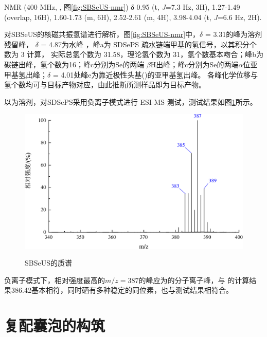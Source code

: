 \documentclass[bachelor,fandolfonts,replaceperiod]{jnuthesis}
\begin{document}
     NMR (400 MHz, , 图\ref{fig:SBSeUS-nmr}) δ 0.95 (t, \textit{J}=7.3 Hz, 3H), 1.27-1.49 (overlap, 16H), 
    1.60-1.73 (m, 6H), 2.52-2.61 (m, 4H), 3.98-4.04 (t, \textit{J}=6.6 Hz, 2H).
    
    对SBSeUS的核磁共振氢谱进行解析，图\ref{fig:SBSeUS-nmr}中，$\delta$ = 3.31的峰为溶剂残留峰，
    $\delta$ = 4.87为水峰\cite{波谱解析} ，峰a为 SDSePS 疏水链端甲基的氢信号，以其积分个数为 3 计算，
    实际总氢个数为 31.58，理论氢个数为 31，氢个数基本吻合；峰b为碳链出峰，氢个数为16；峰c分别为Se的两端
    $\beta$H出峰；峰c分别为Se的两端$\alpha$位亚甲基氢出峰；$\delta$ = 4.01处峰e为靠近极性头基()的亚甲基氢出峰。
    各峰化学位移与氢个数均可与目标产物对应，由此推断所测样品即为目标产物。
    
    以为溶剂，对SDSePS采用负离子模式进行 ESI-MS 测试，测试结果如图\ref{fig:SBSeUS-mass}所示。
    \begin{figure}[htbp]
        \centering
        \includegraphics[width=.8\textwidth]{figure/SBSeUS-mass.pdf}\\
        \caption{SBSeUS的质谱}\label{fig:SBSeUS-mass}
    \end{figure}
    
    负离子模式下，相对强度最高的$m/z = 387$的峰应为的分子离子峰，与
    的计算结果386.42基本相符，同时硒有多种稳定的同位素，也与测试结果相符合。

    \section{复配囊泡的构筑}
\end{document}
